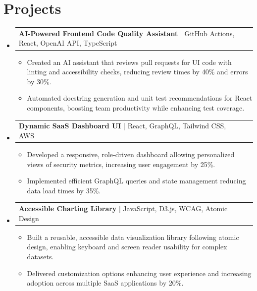 \documentclass[letterpaper,11pt]{article}
\makeatletter
\newcommand{\resumeItem}[1]{
  \item\footnotesize{
    {#1 \vspace{-2pt}}
  }
}
\newcommand{\resumeProjectHeading}[2]{
    \item
    \begin{tabular*}{1.001\textwidth}{l@{\extracolsep{\fill}}r}
      \small#1 & \textbf{\small #2}\\
    \end{tabular*}\vspace{-7pt}
}
\newcommand{\resumeSubHeadingListStart}{\begin{itemize}[leftmargin=0pt, label={}]}
\newcommand{\resumeSubHeadingListEnd}{\end{itemize}}
\newcommand{\resumeItemListStart}{\begin{itemize}[leftmargin=*]}
\newcommand{\resumeItemListEnd}{\end{itemize}\vspace{-5pt}}
\makeatother
\begin{document}
\section{Projects}
    \vspace{-5pt}
    \resumeSubHeadingListStart
      \resumeProjectHeading
          {\textbf{AI-Powered Frontend Code Quality Assistant} | GitHub Actions, React, OpenAI API, TypeScript}{}
          \resumeItemListStart
              \resumeItem{Created an AI assistant that reviews pull requests for UI code with linting and accessibility checks, reducing review times by 40\% and errors by 30\%.}
              \resumeItem{Automated docstring generation and unit test recommendations for React components, boosting team productivity while enhancing test coverage.}
          \resumeItemListEnd
          \vspace{-12pt}
      \resumeProjectHeading
          {\textbf{Dynamic SaaS Dashboard UI} | React, GraphQL, Tailwind CSS, AWS}{}
          \resumeItemListStart
              \resumeItem{Developed a responsive, role-driven dashboard allowing personalized views of security metrics, increasing user engagement by 25\%.}
              \resumeItem{Implemented efficient GraphQL queries and state management reducing data load times by 35\%.}
          \resumeItemListEnd
          \vspace{-12pt}
      \resumeProjectHeading
          {\textbf{Accessible Charting Library} | JavaScript, D3.js, WCAG, Atomic Design}{}
          \resumeItemListStart
              \resumeItem{Built a reusable, accessible data visualization library following atomic design, enabling keyboard and screen reader usability for complex datasets.}
              \resumeItem{Delivered customization options enhancing user experience and increasing adoption across multiple SaaS applications by 20\%.}
          \resumeItemListEnd 
    \resumeSubHeadingListEnd
\end{document}
